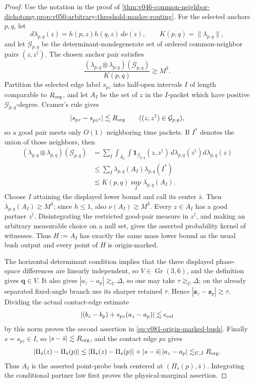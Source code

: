 \documentclass[10pt]{article}
\newcommand{\Gr}{\operatorname{Gr}}
\begin{document}
\begin{proof}
Use the notation in the proof of
\cref{thm:v046-common-neighbor-dichotomy,prop:v050-arbitrary-threshold-maslov-routing}.  For the
selected anchors \(p,q\), let
\[
d\lambda_{p,q}(z)=h(p,z)h(q,z)\,d\nu(z),
\qquad
K(p,q)=\|\lambda_{p,q}\|,
\]
and let \(\mathcal G_{p,q}\) be the determinant-nondegenerate set of ordered common-neighbor pairs
\((z,z^\dagger)\).  The chosen anchor pair satisfies
\[
\frac{(\lambda_{p,q}\otimes\lambda_{p,q})(\mathcal G_{p,q})}{K(p,q)}
\gtrsim M^3.
\]
Partition the selected edge label \(s_{pz}\) into half-open intervals \(I\) of length comparable to
\(R_{\rm org}\), and let \(A_I\) be the set of \(z\) in the \(I\)-packet which have positive
\(\mathcal G_{p,q}\)-degree.  Cramer's rule gives
\[
|s_{pz}-s_{pz^\dagger}|\lesssim R_{\rm org}
\qquad
((z,z^\dagger)\in\mathcal G_{p,q}),
\]
so a good pair meets only \(O(1)\) neighboring time packets.  If \(I^*\) denotes the union of those
neighbors, then
\[
\begin{aligned}
(\lambda_{p,q}\otimes\lambda_{p,q})(\mathcal G_{p,q})
&=
\sum_I
\int_{A_I}\int
\mathbf1_{\mathcal G_{p,q}}(z,z^\dagger)\,
d\lambda_{p,q}(z^\dagger)d\lambda_{p,q}(z)\\
&\le
\sum_I\lambda_{p,q}(A_I)\lambda_{p,q}(I^*)\\
&\lesssim
K(p,q)\sup_I\lambda_{p,q}(A_I).
\end{aligned}
\]
Choose \(I\) attaining the displayed lower bound and call its center \(\bar s\).  Then
\(\lambda_{p,q}(A_I)\gtrsim M^3\); since \(h\le1\), also
\(\nu(A_I)\gtrsim M^3\).  Every \(z\in A_I\) has a good partner \(z^\dagger\).  Disintegrating the
restricted good-pair measure in \(z^\dagger\), and making an arbitrary measurable choice on a null
set, gives the asserted probability kernel of witnesses.  Thus \(H:=A_I\) has exactly the same
mass lower bound as the usual bush output and every point of \(H\) is origin-marked.

The horizontal determinant condition implies that the three displayed phase-space differences
are linearly independent, so \(V\in\Gr(3,6)\), and the definition gives
\(\mathbf q\in V\).  It also gives \(|a_z-a_p|\gtrsim_U\Delta\), so one may take
\(\tau\gtrsim_U\Delta\); on the already separated fixed-angle branch use its sharper retained
\(\tau\).  Hence
\(|\mathbf z_z-\mathbf z_p|\gtrsim\tau\).  Dividing the actual contact-edge estimate
\[
|(b_z-b_p)+s_{pz}(a_z-a_p)|\lesssim\epsilon_{\rm col}
\]
by this norm proves the second assertion in
\eqref{eq:v081-origin-marked-bush}.  Finally \(s=s_{pz}\in I\), so
\(|s-\bar s|\lesssim R_{\rm org}\), and the contact edge \(pz\) gives
\[
|\Pi_{\bar s}(z)-\Pi_{\bar s}(p)|
\le
|\Pi_s(z)-\Pi_s(p)|
+|s-\bar s|\,|a_z-a_p|
\lesssim_{U,J}
R_{\rm org}.
\]
Thus \(A_I\) is the asserted point-probe bush centered at
\((\Pi_{\bar s}(p),\bar s)\).  Integrating the conditional partner law first proves the
physical-marginal assertion.
\end{proof}
\end{document}
